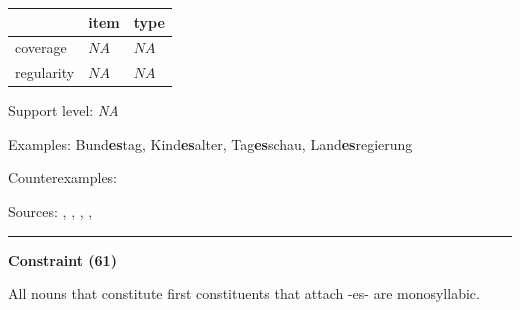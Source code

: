 \vspace{-0.25em}

\begin{table}[!ht]
\begin{center}
\setlength{\extrarowheight}{1pt}
\begin{tabularx}{\columnwidth}{|X|X|X|}
\hline
 & item & type \\
\hline
 coverage & $NA$ & $NA$ \\
\hline
 regularity & $NA$ & $NA$ \\
\hline
\end{tabularx}
\end{center}
\end{table}

\vspace{-1.35em}

\noindent
Support level: \textit{NA}

\vspace{0.3em}

\noindent
Examples: Bund\textbf{es}tag, Kind\textbf{es}alter, Tag\textbf{es}schau, Land\textbf{es}regierung

\noindent
Counterexamples: 

\vspace{0.3em}

\noindent
Sources: \citet[229]{eisenberg_2013}, \citet[11, 18]{kuerschner_2010}, \citet[3, 7]{nuebling_szczepaniak_2008}, \citet[81]{nuebling_szczepaniak_2013}, \citet[8]{schaefer_pankratz_2018}

\vspace{0.35em}
\hrule




\vspace{0.4em}

\begin{center}
\textbf{Constraint (61)}
\end{center}

\noindent
All nouns that constitute first constituents that attach -es- are monosyllabic.
\vspace{0.5em}



